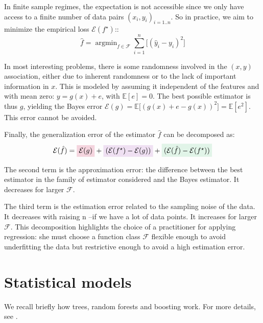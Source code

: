 \documentclass[french,12pt,twoside,a4paper]{book}
\newcommand{\highlight}[2]{\colorbox{#1!17}{$\displaystyle #2$}}
\renewcommand{\highlight}[2]{\colorbox{#1!17}{#2}}
\DeclareMathOperator*{\argmin}{argmin} \def\mycitecolor{green!50!black}
\begin{document}
\begin{appendices}
  In finite sample regimes, the expectation is not accessible since we only have
  access to a finite number of data pairs ${(x_i, y_i)}_{i=1..n}$. So in
  practice, we aim to minimize the empirical loss $\mathcal{E}(f^{\star})$::
  \begin{equation}
    \hat f = \argmin_{f \in \mathcal{F}} \sum_{i=1}^{n} \big [ (\hat{y}_{i} - y_{i})^2 \big]
  \end{equation}

  In most interesting problems, there is some randomness involved in the $(x,y)$
  association, either due to inherent randomness or to the lack of important
  information in $x$. This is modeled by assuming it independent of the features
  and with mean zero: $y = g(x) + e$, with $\mathbb E[e]=0$. The best possible estimator
  is thus $g$, yielding the Bayes error \highlight{bayes_error}{\color{black} $\mathcal{E}(g) =
      \mathbb{E} \big [ (g(x) + e - g(x))^2 \big]=\mathbb{E}[e^2]$}. This error
  cannot be avoided.

  Finally, the generalization error of the estimator $\hat f$ can be decomposed as:
  \begin{equation}
    \mathcal{E}(\hat f) = \highlight{bayes_error}{\color{black} $\mathcal{E}(g)$} +
    \highlight{approximation_error}{$(\mathcal{E}(f^{\star}) - \mathcal{E}(g))$} +
    \highlight{estimation_error}{$(\mathcal{E}(\hat{f}) - \mathcal{E}(f^{\star}))$}
  \end{equation}


  The \highlight{approximation_error}{second term} is the approximation error: the difference between the best
  estimator in the family of estimator considered and the Bayes estimator. It
  decreases for larger $\mathcal{F}$.

  The \highlight{estimation_error}{third term} is the estimation error related to the
  sampling noise of the data. It decreases with raising n --if we have a lot of
  data points. It increases for larger $\mathcal{F}$. This decomposition
  highlights the choice of a practitioner for applying regression: she must
  choose a function class $\mathcal{F}$ flexible enough to avoid underfitting
  the data but restrictive enough to avoid a high estimation error.

  \section{Statistical models}\label{apd:intro:statistical_models}

  We recall briefly how trees, random forests and boosting work. For more
  details, see \citep{hastie2009elements}.


\end{appendices}
\end{document}
